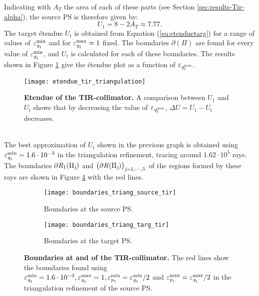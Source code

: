 Indicating with $A_T$ the area of each of these parts (see Section \ref{sec:results-Tir-alpha}), the source PS is therefore given by:
\begin{equation}
U_1 = 8-2A_T\approx 7.77.
\end{equation}
The target \'{e}tendue $U_{\textrm{t}}$ is obtained from Equation (\ref{eq:etenduetarg}) for a range of values of $\varepsilon_{\textit{q}_1}^{\textrm{min}}$ and for $\varepsilon_{\textit{q}_1}^{\textrm{max}}=1$ fixed. The boundaries $\partial$$(\Pi)$ are found for every value of $\varepsilon_{\textit{q}_1}^{\textrm{min}}$, and $U_{\textrm{t}}$ is calculated for each of these boundaries. 
The results shown in Figure \ref{fig:etendue_tir_triangulation} give the \'{e}tendue plot as a function of $\varepsilon_{\textit{q}_{1}^{\textrm{min}}}$.
 \begin{figure}[t]
  \center
  \texttt{[image: etendue\_tir\_triangulation]}
  \caption{\textbf{Etendue of the TIR-collimator.} A comparison between $U_1$ and $U_{\textrm{t}}$ shows that by decreasing the value of $\varepsilon_{\textit{q}_{1}^{\textrm{min}}}$, $\Delta U= U_1-U_{\textrm{t}}$ decreases.}
  \label{fig:etendue_tir_triangulation}
\end{figure}
\\ \indent 
The best approximation of $U_{\textrm{t}}$ shown in the previous graph is obtained using $\varepsilon_{\textit{q}_1}^{\textrm{min}}=1.6\cdot 10^{-3}$ in the triangulation refinement, tracing around $1.62 \cdot 10^5$ rays. The boundaries $\partial\mbox{$\emph{R}_{\textit{$1$}}$}(\Pi_{\textit{j}})$ and $\big(\partial\mbox{$\emph{R}_{\textit{}}$}(\Pi_{\textit{j}})\big)_{\textit{j} = 1, \cdots, 5}$ of the regions formed by these rays are shown in Figure \ref{fig:boundaries_TIR_triangulation} with the red lines. 
\begin{figure}[h]
 \begin{subfigure}[t]{0.47\textwidth}
\centering
    \texttt{[image: boundaries\_triang\_source\_tir]}
    \caption{Boundaries at the source PS.}
    \label{fig:boundaries_triang_source_tir}
\end{subfigure}
\hfill
\begin{subfigure}[t]{0.47\textwidth}
\centering
    \texttt{[image: boundaries\_triang\_targ\_tir]}
    \caption{Boundaries at the target PS.}
    \label{fig:boundaries_triang_target_tir}
\end{subfigure}
\caption{\textbf{Boundaries at  and  of the TIR-collimator.} The red lines show the boundaries found using $\varepsilon_{\textit{q}_1}^{\textrm{min}}=1.6\cdot 10^{-3}, \varepsilon_{\textit{q}_1}^{\textrm{max}}=1, \varepsilon_{\textit{p}_1}^{\textrm{min}}=\varepsilon_{\textit{q}_1}^{\textrm{min}}/2$ and $\varepsilon_{\textit{p}_1}^{\textrm{max}} = \varepsilon_{\textit{q}_1}^{\textrm{max}}/2$ in the triangulation refinement of the source PS.}
 \label{fig:boundaries_TIR_triangulation}
\end{figure}
